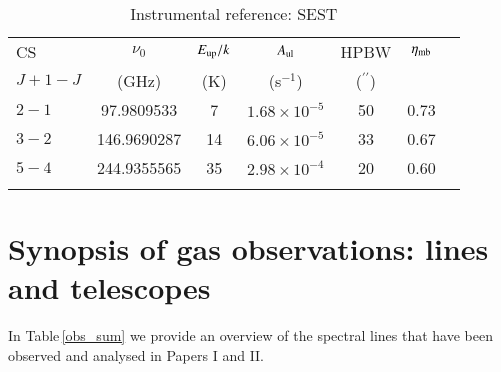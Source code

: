 \documentclass{aa}
\newcommand{\asec}{$^{\prime \prime}$}
\begin{document}
\begin{table}[h]
\caption{Instrumental reference: SEST}             %
\label{SEST}      %
\begin{tabular}{lcccccc}    %
\hline\hline    
\noalign{\smallskip}             
        CS              &   $\nu_0$                     & $E_{\rm up}/k$         & $A_{\rm ul}$          &  HPBW & $\eta_{\rm mb}$        \\
$J+1 - J$               &   (GHz)                               & (K)                           & (s$^{-1}$)              &  (\asec)      &                               \\
\noalign{\smallskip}    
\hline                        %
\noalign{\smallskip}    
\noalign{\smallskip}    
$2-1$   &\phantom{1} 97.9809533& 7                      & $1.68 \times 10^{-5}$ &       50      & 0.73     \\
$3-2$   &  146.9690287  & 14                            &  $6.06 \times 10^{-5}$        &       33      & 0.67    \\      
$5-4$   &  244.9355565  & 35                            &  $2.98 \times 10^{-4}$        &       20      & 0.60    \\
\noalign{\smallskip}    
\hline                                   %
\end{tabular}
\end{table}

\section{Synopsis of gas observations: lines and telescopes }

In Table\,\ref{obs_sum} we provide an overview of the spectral lines that have been observed and analysed in Papers I and II.
\end{document}
